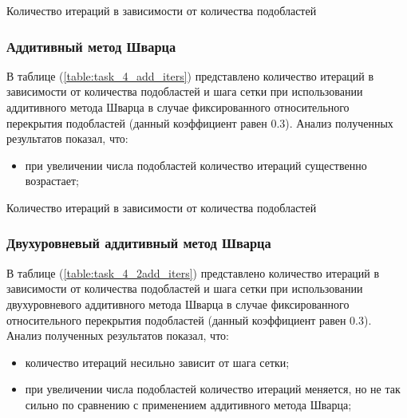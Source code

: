\documentclass[a4paper]{article}
\begin{document}
\begin{table}[h]
\caption{Количество итераций в зависимости от количества подобластей}
\label{table:task_4_mult_iters}
\end{table}

\subsubsection{Аддитивный метод Шварца}

В таблице (\ref{table:task_4_add_iters}) представлено количество итераций в зависимости от количества подобластей и шага сетки при использовании аддитивного метода Шварца в случае фиксированного относительного перекрытия подобластей (данный коэффициент равен 0.3). Анализ полученных результатов показал, что:
\begin{itemize}
\item при увеличении числа подобластей количество итераций существенно возрастает;
\end{itemize}

\begin{table}[h]
\caption{Количество итераций в зависимости от количества подобластей}
\label{table:task_4_add_iters}
\end{table}

\subsubsection{Двухуровневый аддитивный метод Шварца}

В таблице (\ref{table:task_4_2add_iters}) представлено количество итераций в зависимости от количества подобластей и шага сетки при использовании двухуровневого аддитивного метода Шварца в случае фиксированного относительного перекрытия подобластей (данный коэффициент равен 0.3). Анализ полученных результатов показал, что:
\begin{itemize}
\item количество итераций несильно зависит от шага сетки;
\item при увеличении числа подобластей количество итераций меняется, но не так сильно по сравнению с применением аддитивного метода Шварца;
\end{itemize}
\end{document}
